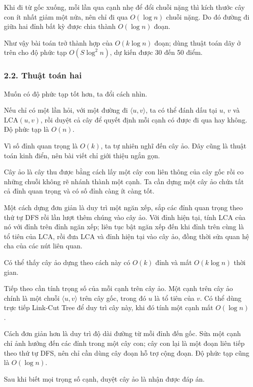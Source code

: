 \documentclass[11pt]{article}
\begin{document}
Khi đi từ gốc xuống, mỗi lần qua cạnh nhẹ để đổi chuỗi nặng thì kích thước cây
con ít nhất giảm một nửa, nên chỉ đi qua \(O(\log n)\) chuỗi nặng. Do đó
đường đi giữa hai đỉnh bất kỳ được chia thành \(O(\log n)\) đoạn.

Như vậy bài toán trở thành hợp của \(O(k\log n)\) đoạn; dùng thuật toán dãy ở
trên cho độ phức tạp \(O(S\log^2 n)\), dự kiến được 30 đến 50 điểm.

\subsubsection*{2.2. Thuật toán hai}

Muốn có độ phức tạp tốt hơn, ta đổi cách nhìn.

Nếu chỉ có một lần hỏi, với một đường đi \(\langle u,v\rangle\), ta có thể
đánh dấu tại \(u\), \(v\) và \(\mathrm{LCA}(u,v)\), rồi duyệt cả cây để quyết
định mỗi cạnh có được đi qua hay không. Độ phức tạp là \(O(n)\).

Vì số đỉnh quan trọng là \(O(k)\), ta tự nhiên nghĩ đến cây ảo. Đây cũng là
thuật toán kinh điển, nên bài viết chỉ giới thiệu ngắn gọn.

Cây ảo là cây thu được bằng cách lấy một cây con liên thông của cây gốc rồi co
những chuỗi không rẽ nhánh thành một cạnh. Ta cần dựng một cây ảo chứa tất cả
đỉnh quan trọng và có số đỉnh càng ít càng tốt.

Một cách dựng đơn giản là duy trì một ngăn xếp, sắp các đỉnh quan trọng theo
thứ tự DFS rồi lần lượt thêm chúng vào cây ảo. Với đỉnh hiện tại, tính LCA của
nó với đỉnh trên đỉnh ngăn xếp; liên tục bật ngăn xếp đến khi đỉnh trên cùng
là tổ tiên của LCA, rồi đưa LCA và đỉnh hiện tại vào cây ảo, đồng thời sửa
quan hệ cha của các nút liên quan.

Có thể thấy cây ảo dựng theo cách này có \(O(k)\) đỉnh và mất
\(O(k\log n)\) thời gian.

Tiếp theo cần tính trọng số của mỗi cạnh trên cây ảo. Một cạnh trên cây ảo
chính là một chuỗi \(\langle u,v\rangle\) trên cây gốc, trong đó \(u\) là tổ
tiên của \(v\). Có thể dùng trực tiếp Link-Cut Tree để duy trì cây này, khi đó
tính một cạnh mất \(O(\log n)\).

Cách đơn giản hơn là duy trì độ dài đường từ mỗi đỉnh đến gốc. Sửa một cạnh
chỉ ảnh hưởng đến các đỉnh trong một cây con; cây con lại là một đoạn liên
tiếp theo thứ tự DFS, nên chỉ cần dùng cây đoạn hỗ trợ cộng đoạn. Độ phức tạp
cũng là \(O(\log n)\).

Sau khi biết mọi trọng số cạnh, duyệt cây ảo là nhận được đáp án.
\end{document}
